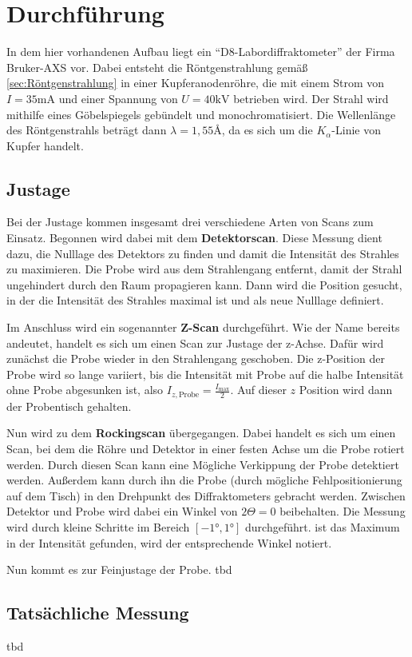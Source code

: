 \section{Durchführung}
\label{sec:Durchführung}

In dem hier vorhandenen Aufbau liegt ein \enquote{D8-Labordiffraktometer} der Firma Bruker-AXS vor.
Dabei entsteht die Röntgenstrahlung gemäß \autoref{sec:Röntgenstrahlung} in einer Kupferanodenröhre, die mit einem Strom von $I=35\unit{\milli\ampere}$ 
und einer Spannung von $U = 40 \unit{\kilo\volt}$ betrieben wird.
Der Strahl wird mithilfe eines Göbelspiegels gebündelt und monochromatisiert.
Die Wellenlänge des Röntgenstrahls beträgt dann $\lambda = 1,55 \unit{\angstrom}$, da es sich um die $K_\alpha$-Linie von Kupfer handelt.

\subsection{Justage} \label{sec:Justage}

Bei der Justage kommen insgesamt drei verschiedene Arten von Scans zum Einsatz.
Begonnen wird dabei mit dem \textbf{Detektorscan}.
Diese Messung dient dazu, die Nulllage des Detektors zu finden und damit die Intensität des Strahles zu maximieren.
Die Probe wird aus dem Strahlengang entfernt, damit der Strahl ungehindert durch den Raum propagieren kann.
Dann wird die Position gesucht, in der die Intensität des Strahles maximal ist und als neue Nulllage definiert.

Im Anschluss wird ein sogenannter \textbf{Z-Scan} durchgeführt.
Wie der Name bereits andeutet, handelt es sich um einen Scan zur Justage der z-Achse.
Dafür wird zunächst die Probe wieder in den Strahlengang geschoben.
Die z-Position der Probe wird so lange variiert, bis die Intensität mit Probe auf die halbe Intensität ohne Probe abgesunken ist, also $I_{z,\text{Probe}} = \frac{I_\text{max}}{2}$.
Auf dieser $z$ Position wird dann der Probentisch gehalten.

Nun wird zu dem \textbf{Rockingscan} übergegangen.
Dabei handelt es sich um einen Scan, bei dem die Röhre und Detektor in einer festen Achse um die Probe rotiert werden.
Durch diesen Scan kann eine Mögliche Verkippung der Probe detektiert werden.
Außerdem kann durch ihn die Probe (durch mögliche Fehlpositionierung auf dem Tisch) in den Drehpunkt des Diffraktometers gebracht werden.
Zwischen Detektor und Probe wird dabei ein Winkel von $2 \Theta = 0$ beibehalten.
Die Messung wird durch kleine Schritte im Bereich $[-1°,1°]$ durchgeführt.
ist das Maximum in der Intensität gefunden, wird der entsprechende Winkel notiert.

Nun kommt es zur Feinjustage der Probe.
tbd

\subsection{Tatsächliche Messung}
tbd